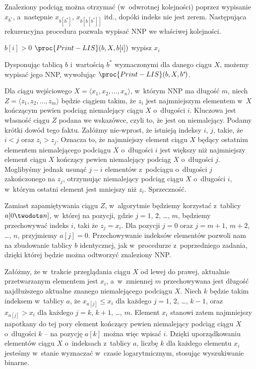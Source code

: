 Znaleziony podciąg można otrzymać (w~odwrotnej kolejności) poprzez wypisanie $x_{b^*\!}$, a~następnie $x_{b[b^*\!]}$, $x_{b[b[b^*\!]]}$ itd., dopóki indeks nie jest zerem.
Następująca rekurencyjna procedura pozwala wypisać NNP we właściwej kolejności.
\begin{codebox}
\li	\If $b[i]>0$
\li		\Then $\proc{Print-LIS}(b,X,b[i])$
		\End
\li	wypisz $x_i$
\end{codebox}
Dysponując tablicą $b$ i~wartością $b^*\!$ wyznaczonymi dla danego ciągu $X$, możemy wypisać jego NNP, wywołując $\proc{Print-LIS}(b,X,b^*\!)$.

\exercise %
Dla ciągu wejściowego $X=\langle x_1,x_2,\dots,x_n\rangle$, w~którym NNP ma długość $m$, niech $Z=\langle z_1,z_2,\dots,z_m\rangle$ będzie ciągiem takim, że $z_i$ jest najmniejszym elementem w~$X$ kończącym pewien podciąg niemalejący ciągu $X$ o~długości $i$.
Kluczowa jest własność ciągu $Z$ podana we wskazówce, czyli to, że jest on niemalejący.
Podamy krótki dowód tego faktu.
Załóżmy nie-wprost, że istnieją indeksy $i$, $j$, takie, że $i<j$ oraz $z_i>z_j$.
Oznacza to, że najmniejszy element ciągu $X$ będący ostatnim elementem niemalejącego podciągu $X$ o~długości $i$ jest większy niż najmniejszy element ciągu $X$ kończący pewien niemalejący podciąg $X$ o~długości $j$.
Moglibyśmy jednak usunąć $j-i$ elementów z~podciągu o~długości $j$ zakończonego na $z_j$, otrzymując niemalejący podciąg ciągu $X$ o~długości $i$, w~którym ostatni element jest mniejszy niż $z_i$.
Sprzeczność.

Zamiast zapamiętywania ciągu $Z$, w~algorytmie będziemy korzystać z~tablicy $a[0\twodots n]$, w~której na  pozycji, gdzie $j=1$, 2, \dots, $m$, będziemy przechowywać indeks $i$, taki że $z_j=x_i$.
Dla pozycji $j=0$ oraz $j=m+1$, $m+2$, \dots, $n$, przyjmiemy $a[j]=0$.
Przechowywanie indeksów elementów pozwoli nam na zbudowanie tablicy $b$ identycznej, jak w~procedurze  z~poprzedniego zadania, dzięki której będzie można odtworzyć znaleziony NNP.

Załóżmy, że w~trakcie przeglądania ciągu $X$ od lewej do prawej, aktualnie przetwarzanym elementem jest $x_i$, a~w~zmiennej $m$ przechowywana jest długość najdłuższego aktualne znanego niemalejącego podciągu $X$.
Niech $k$ będzie takim indeksem w~tablicy $a$, że $x_{a[j]}\le x_i$ dla każdego $j=1$, 2, \dots, $k-1$, oraz $x_{a[j]}>x_i$ dla każdego $j=k$, $k+1$, \dots, $m$.
Element $x_i$ stanowi zatem najmniejszy napotkany do tej pory element kończący pewien niemalejący podciąg ciągu $X$ o~długości $k$ -- na pozycję $a[k]$ można więc wpisać $i$.
Dzięki uporządkowaniu elementów ciągu $X$ o~indeksach z~tablicy $a$, liczbę $k$ dla każdego elementu $x_i$ jesteśmy w~stanie wyznaczać w~czasie logarytmicznym, stosując wyszukiwanie binarne.

